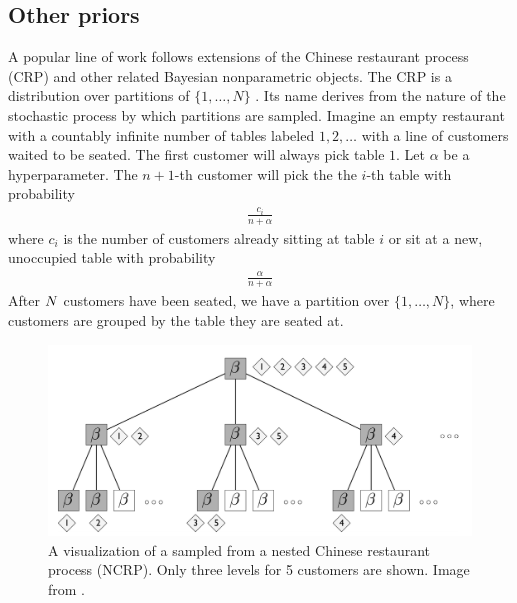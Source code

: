 \subsection{Other priors}

A popular line of work
follows extensions of the Chinese restaurant
process (CRP) and other related Bayesian nonparametric objects.
The CRP is a distribution
over partitions of $\{1, \ldots, N\}$ \citep{Aldous1985}.
Its name derives
from the nature of the stochastic process
by which partitions are sampled.
Imagine an empty restaurant with
a countably infinite number of tables
labeled $1, 2, \ldots$
with a line of customers waited to be seated.
The first customer will always pick 
table $1$.
Let $\alpha$ be a hyperparameter.
The $n + 1$-th customer will pick the
the $i$-th table with probability
\begin{align}
    \frac{c_i}{n + \alpha}
\end{align}
where $c_i$ is the number
of customers already sitting at
table $i$ or
sit at a new, unoccupied table with probability
\begin{align}
    \frac{\alpha}{n + \alpha}
\end{align}
After $N$ customers have been seated,
we have a partition over $\{1,\ldots, N\}$,
where customers are grouped
by the table they are seated at.

\begin{figure}[t]
  \includegraphics[width=\textwidth]{img/trees/ncrp}
  \caption{A visualization of a sampled from
  a nested Chinese
  restaurant process (NCRP). Only three levels
  for 5 customers are shown.
  Image from \citet{Blei2010}.}
\label{fig:ncrp}
\end{figure}

